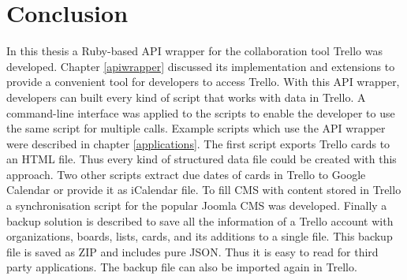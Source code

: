 \onehalfspacing
\chapter{Conclusion}
  \label{Conclusion}

In this thesis a Ruby-based API wrapper for the collaboration tool Trello was developed. Chapter \ref{apiwrapper} discussed its implementation and extensions to provide a convenient tool for developers to access Trello. With this API wrapper, developers can built every kind of script that works with data in Trello. A command-line interface was applied to the scripts to enable the developer to use the same script for multiple calls. Example scripts which use the API wrapper were described in chapter \ref{applications}. The first script exports Trello cards to an HTML file. Thus every kind of structured data file could be created with this approach. Two other scripts extract due dates of cards in Trello to Google Calendar or provide it as iCalendar file. To fill CMS with content stored in Trello a synchronisation script for the popular Joomla CMS was developed. Finally a backup solution is described to save all the information of a Trello account with organizations, boards, lists, cards, and its additions to a single file. This backup file is saved as ZIP and includes pure JSON. Thus it is easy to read for third party applications. The backup file can also be imported again in Trello. 